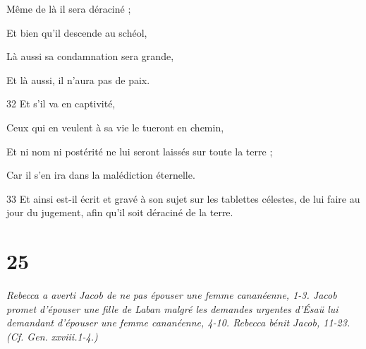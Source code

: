 \par     Même de là il sera déraciné ;
\par    
\par     Et bien qu'il descende au schéol,  
\par     Là aussi sa condamnation sera grande,  
\par     Et là aussi, il n'aura pas de paix.  
\par    
\par 32 Et s'il va en captivité,  
\par     Ceux qui en veulent à sa vie le tueront en chemin,  
\par     Et ni nom ni postérité ne lui seront laissés sur toute la terre ;  
\par     Car il s'en ira dans la malédiction éternelle.
\par    
\par 33 Et ainsi est-il écrit et gravé à son sujet sur les tablettes célestes, de lui faire au jour du jugement, afin qu'il soit déraciné de la terre.

\chapter{25}

\par \textit{Rebecca a averti Jacob de ne pas épouser une femme cananéenne, 1-3. Jacob promet d'épouser une fille de Laban malgré les demandes urgentes d'Ésaü lui demandant d'épouser une femme cananéenne, 4-10. Rebecca bénit Jacob, 11-23. (Cf. Gen. xxviii.1-4.)}

